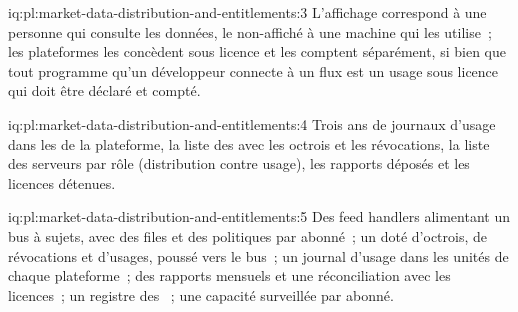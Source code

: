 \begin{solution}{iq:pl:market-data-distribution-and-entitlements:3}
L'affichage correspond à une personne qui consulte les données, le non-affiché à une machine qui les utilise~; les plateformes les concèdent sous licence et les comptent séparément, si bien que tout programme qu'un développeur
connecte à un flux est un usage sous licence qui doit être déclaré et compté.
\end{solution}

\begin{solution}{iq:pl:market-data-distribution-and-entitlements:4}
Trois ans de journaux d'usage dans les  de la plateforme, la liste des  avec les octrois et les révocations, la liste des serveurs par rôle
(distribution contre usage), les rapports déposés et les licences détenues.
\end{solution}

\begin{solution}{iq:pl:market-data-distribution-and-entitlements:5}
Des feed handlers alimentant un bus à sujets, avec des files et des politiques par abonné~; un  doté d'octrois, de révocations et d'usages, poussé
vers le bus~; un journal d'usage dans les unités de chaque plateforme~; des rapports mensuels et une réconciliation avec les licences~; un registre des ~;
une capacité surveillée par abonné.
\end{solution}
